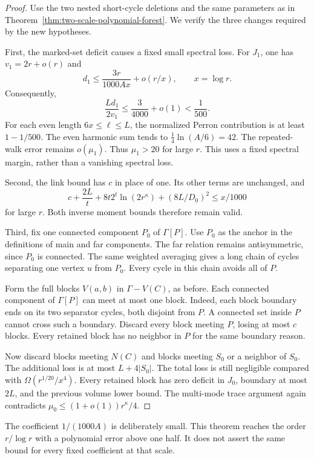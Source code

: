 \begin{proof}
Use the two nested short-cycle deletions and the same parameters as in Theorem~\ref{thm:two-scale-polynomial-forest}.
We verify the three changes required by the new hypotheses.

First, the marked-set deficit causes a fixed small spectral loss.
For $J_1$, one has $v_1=2r+o(r)$ and
\[
 d_1\le\frac{3r}{1000Ax}+o(r/x),\qquad x=\log r.
\]
Consequently,
\[
 \frac{Ld_1}{2v_1}\le\frac3{4000}+o(1)<\frac1{500}.
\]
For each even length $6x\le\ell\le L$, the normalized Perron contribution is at least $1-1/500$.
The even harmonic sum tends to $\tfrac14\ln(A/6)=42$.
The repeated-walk error remains $o(\mu_1)$.
Thus $\mu_1>20$ for large $r$.
This uses a fixed spectral margin, rather than a vanishing spectral loss.

Second, the link bound has $c$ in place of one.
Its other terms are unchanged, and
\[
 c+\frac{2L}{t}+8t2^t\ln(2r^\kappa)+(8L/D_0)^2
 \le x/1000
\]
for large $r$.
Both inverse moment bounds therefore remain valid.

Third, fix one connected component $P_0$ of $\Gamma[P]$.
Use $P_0$ as the anchor in the definitions of main and far components.
The far relation remains antisymmetric, since $P_0$ is connected.
The same weighted averaging gives a long chain of cycles separating one vertex $u$ from $P_0$.
Every cycle in this chain avoids all of $P$.

Form the full blocks $V(a,b)$ in $\Gamma-V(C)$, as before.
Each connected component of $\Gamma[P]$ can meet at most one block.
Indeed, each block boundary ends on its two separator cycles, both disjoint from $P$.
A connected set inside $P$ cannot cross such a boundary.
Discard every block meeting $P$, losing at most $c$ blocks.
Every retained block has no neighbor in $P$ for the same boundary reason.

Now discard blocks meeting $N(C)$ and blocks meeting $S_0$ or a neighbor of $S_0$.
The additional loss is at most $L+4|S_0|$.
The total loss is still negligible compared with $\Omega(r^{1/20}/x^4)$.
Every retained block has zero deficit in $J_0$, boundary at most $2L$, and the previous volume lower bound.
The multi-mode trace argument again contradicts
$\mu_0\le(1+o(1))r^\kappa/4$.
\end{proof}

The coefficient $1/(1000A)$ is deliberately small.
This theorem reaches the order $r/\log r$ with a polynomial error above one half.
It does not assert the same bound for every fixed coefficient at that scale.

